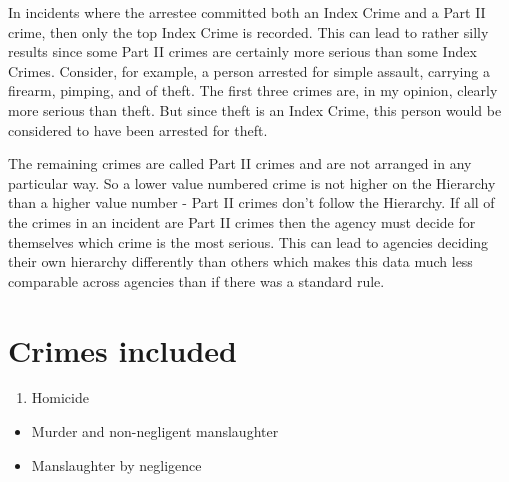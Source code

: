 \documentclass[
  12pt,
  openany]{book}
\providecommand{\tightlist}{%
  \setlength{\itemsep}{0pt}\setlength{\parskip}{0pt}}
\begin{document}
In incidents where the arrestee committed both an Index Crime and a Part II crime, then only the top Index Crime is recorded. This can lead to rather silly results since some Part II crimes are certainly more serious than some Index Crimes. Consider, for example, a person arrested for simple assault, carrying a firearm, pimping, and of theft. The first three crimes are, in my opinion, clearly more serious than theft. But since theft is an Index Crime, this person would be considered to have been arrested for theft.

The remaining crimes are called Part II crimes and are not arranged in any particular way. So a lower value numbered crime is not higher on the Hierarchy than a higher value number - Part II crimes don't follow the Hierarchy. If all of the crimes in an incident are Part II crimes then the agency must decide for themselves which crime is the most serious. This can lead to agencies deciding their own hierarchy differently than others which makes this data much less comparable across agencies than if there was a standard rule.

\hypertarget{arrestsCrimesIncluded}{%
\section{Crimes included}\label{arrestsCrimesIncluded}}

\begin{enumerate}
\def\labelenumi{\arabic{enumi}.}
\tightlist
\item
  Homicide
\end{enumerate}

\begin{itemize}
\tightlist
\item
  Murder and non-negligent manslaughter
\item
  Manslaughter by negligence
\end{itemize}
\end{document}
